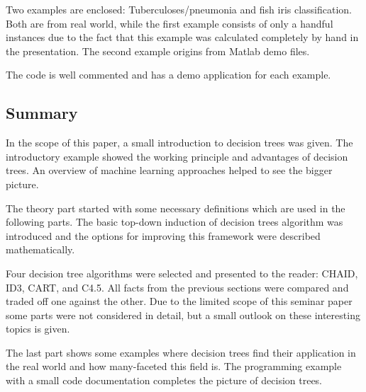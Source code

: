 Two examples are enclosed: Tuberculoses/pneumonia and fish iris classification. Both are from real world, while the first example consists of only a handful instances due to the fact that this example was calculated completely by hand in the presentation. The second example origins from Matlab demo files. 

The code is well commented and has a demo application for each example. 



\subsection{Summary}

In the scope of this paper, a small introduction to decision trees was given. The introductory example showed the working principle and advantages of decision trees. An overview of machine learning approaches helped to see the bigger picture.  

The theory part started with some necessary definitions which are used in the following parts. The basic top-down induction of decision trees algorithm was introduced and the options for improving this framework were described mathematically.

Four decision tree algorithms were selected and presented to the reader: CHAID, ID3, CART, and C4.5. All facts from the previous sections were compared and traded off one against the other. Due to the limited scope of this seminar paper some parts were not considered in detail, but a small outlook on these interesting topics is given.

The last part shows some examples where decision trees find their application in the real world and how many-faceted this field is. The programming example with a small code documentation completes the picture of decision trees. 








